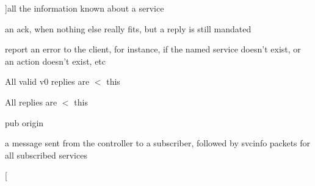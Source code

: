 \begin{Desc}
\begin{description}
{}]all the information known about a service \item[{\em 
UPK\_\-REPL\_\-ACK\label{controller_2tp_8c_gab04f5fc5314f6296f0ef4b171d1b4282acbf1523c6bf5cc236d060d6d0ba7db2d}
}]an ack, when nothing else really fits, but a reply is still mandated \item[{\em 
UPK\_\-REPL\_\-ERROR\label{controller_2tp_8c_gab04f5fc5314f6296f0ef4b171d1b4282aa041df31800d879a09a3ce477e222c6d}
}]report an error to the client, for instance, if the named service doesn't exist, or an action doesn't exist, etc \item[{\em 
UPK\_\-REPL\_\-V0\_\-PROTO\_\-LIMIT\label{controller_2tp_8c_gab04f5fc5314f6296f0ef4b171d1b4282a2eb1a2fa31ca50bb78d16ce51c2c4524}
}]All valid v0 replies are $<$ this \item[{\em 
UPK\_\-REPL\_\-LIMIT\label{controller_2tp_8c_gab04f5fc5314f6296f0ef4b171d1b4282a02e71af273f9b7092b8cc2f782f3da5e}
}]All replies are $<$ this \item[{\em 
UPK\_\-PUB\_\-ORIGIN\label{controller_2tp_8c_gab04f5fc5314f6296f0ef4b171d1b4282a64e55f7bd2b88ea1d929a5e158b0a64b}
}]pub origin \item[{\em 
UPK\_\-PUB\_\-PUBLICATION\label{controller_2tp_8c_gab04f5fc5314f6296f0ef4b171d1b4282a0aca3ba5b1fdb79e07fb737421a3de5e}
}]a message sent from the controller to a subscriber, followed by svcinfo packets for all subscribed services \item[{\em 
}
\end{description}
\end{Desc}
